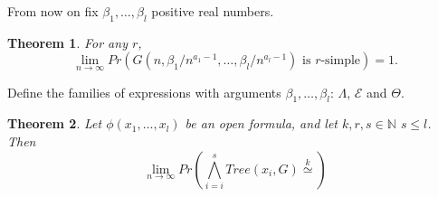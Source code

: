 \documentclass[11pt,notitlepage]{report}
\newtheorem{theorem}{Theorem}[chapter]
\theoremstyle{definition}
\newcommand{\N}{\mathbb{N}}
\newcommand{\Ln}{\lim\limits_{n\to \infty}}
\newcommand{\morph}[1]{\stackrel{#1}{\simeq}}
\begin{document}
From now on fix $\beta_1,\dots,\beta_l$ positive real numbers. 


\begin{theorem} For any $r$,
	\[\Ln Pr(G(n,\beta_1/n^{a_1-1}, \dots,\beta_l/n^{a_l-1} ) \text{ is }r \text{-simple})=1 .\]
\end{theorem}

Define the families of expressions with arguments $\beta_1,\dots, \beta_l$: 
$\Lambda$, $\mathcal{E}$ and $\Theta$.


\begin{theorem} 
	Let $\phi(x_1,\dots, x_l)$ be an open formula, and let $k,r,s\in \N$ $s\leq l$. Then
	\[ \Ln Pr(\bigwedge_{i=i}^s Tree(x_i,G)\morph{k} )   	\]
	
\end{theorem}
 





\end{document}
